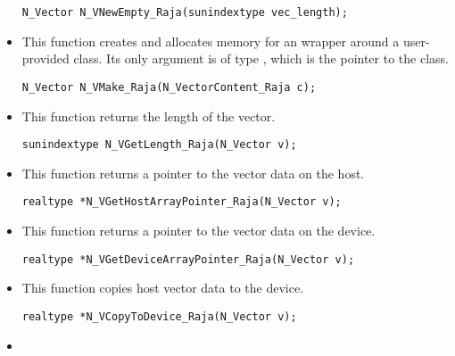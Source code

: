 \begin{itemize}
\begin{verbatim}
N_Vector N_VNewEmpty_Raja(sunindextype vec_length);
\end{verbatim}



\item {}

  This function creates and allocates memory for an {\nvecraja}
  wrapper around a user-provided  class.
  Its only argument is of type , which
  is the pointer to the class.

\begin{verbatim}
N_Vector N_VMake_Raja(N_VectorContent_Raja c);
\end{verbatim}



\item {}

 This function returns the length of the vector.

 \verb|sunindextype N_VGetLength_Raja(N_Vector v);|


\item {}

 This function returns a pointer to the vector data on the host.

 \verb|realtype *N_VGetHostArrayPointer_Raja(N_Vector v);|



\item {}

 This function returns a pointer to the vector data on the device.

 \verb|realtype *N_VGetDeviceArrayPointer_Raja(N_Vector v);|



\item {}

 This function copies host vector data to the device.

 \verb|realtype *N_VCopyToDevice_Raja(N_Vector v);|



\item {}


\end{itemize}
